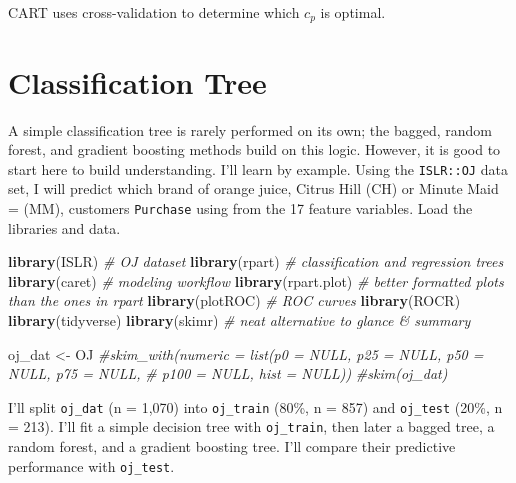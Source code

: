 \documentclass[
]{book}
\newenvironment{Shaded}{\begin{snugshade}}{\end{snugshade}}
\newcommand{\CommentTok}[1]{\textcolor[rgb]{0.56,0.35,0.01}{\textit{#1}}}
\newcommand{\DataTypeTok}[1]{\textcolor[rgb]{0.13,0.29,0.53}{#1}}
\newcommand{\DecValTok}[1]{\textcolor[rgb]{0.00,0.00,0.81}{#1}}
\newcommand{\FloatTok}[1]{\textcolor[rgb]{0.00,0.00,0.81}{#1}}
\newcommand{\KeywordTok}[1]{\textcolor[rgb]{0.13,0.29,0.53}{\textbf{#1}}}
\newcommand{\NormalTok}[1]{#1}
\newcommand{\OperatorTok}[1]{\textcolor[rgb]{0.81,0.36,0.00}{\textbf{#1}}}
\newcommand{\OtherTok}[1]{\textcolor[rgb]{0.56,0.35,0.01}{#1}}
\newcommand{\StringTok}[1]{\textcolor[rgb]{0.31,0.60,0.02}{#1}}
\begin{document}
CART uses cross-validation to determine which \(c_p\) is optimal.

\hypertarget{classification-tree}{%
\section{Classification Tree}\label{classification-tree}}

A simple classification tree is rarely performed on its own; the bagged, random forest, and gradient boosting methods build on this logic. However, it is good to start here to build understanding. I'll learn by example. Using the \texttt{ISLR::OJ} data set, I will predict which brand of orange juice, Citrus Hill (CH) or Minute Maid = (MM), customers \texttt{Purchase} using from the 17 feature variables. Load the libraries and data.

\begin{Shaded}
\begin{Highlighting}[]
\KeywordTok{library}\NormalTok{(ISLR)  }\CommentTok{# OJ dataset}
\KeywordTok{library}\NormalTok{(rpart)  }\CommentTok{# classification and regression trees }
\KeywordTok{library}\NormalTok{(caret)  }\CommentTok{# modeling workflow}
\KeywordTok{library}\NormalTok{(rpart.plot)  }\CommentTok{# better formatted plots than the ones in rpart}
\KeywordTok{library}\NormalTok{(plotROC)  }\CommentTok{# ROC curves}
\KeywordTok{library}\NormalTok{(ROCR)}
\KeywordTok{library}\NormalTok{(tidyverse)}
\KeywordTok{library}\NormalTok{(skimr)  }\CommentTok{# neat alternative to glance & summary}

\NormalTok{oj_dat <-}\StringTok{ }\NormalTok{OJ}
\CommentTok{#skim_with(numeric = list(p0 = NULL, p25 = NULL, p50 = NULL, p75 = NULL, }
\CommentTok{#                                p100 = NULL, hist = NULL))}
\CommentTok{#skim(oj_dat)}
\end{Highlighting}
\end{Shaded}

I'll split \texttt{oj\_dat} (n = 1,070) into \texttt{oj\_train} (80\%, n = 857) and \texttt{oj\_test} (20\%, n = 213). I'll fit a simple decision tree with \texttt{oj\_train}, then later a bagged tree, a random forest, and a gradient boosting tree. I'll compare their predictive performance with \texttt{oj\_test}.

\begin{Shaded}
\end{Shaded}
\end{document}

